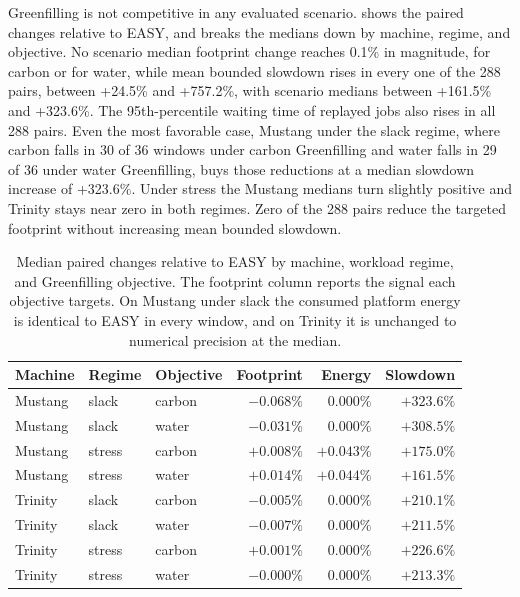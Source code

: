 Greenfilling is not competitive in any evaluated scenario.  shows the paired changes relative to EASY, and  breaks the medians down by machine, regime, and objective. No scenario median footprint change reaches 0.1\% in magnitude, for carbon or for water, while mean bounded slowdown rises in every one of the 288 pairs, between +24.5\% and +757.2\%, with scenario medians between +161.5\% and +323.6\%. The 95th-percentile waiting time of replayed jobs also rises in all 288 pairs. Even the most favorable case, Mustang under the slack regime, where carbon falls in 30 of 36 windows under carbon Greenfilling and water falls in 29 of 36 under water Greenfilling, buys those reductions at a median slowdown increase of +323.6\%. Under stress the Mustang medians turn slightly positive and Trinity stays near zero in both regimes. Zero of the 288 pairs reduce the targeted footprint without increasing mean bounded slowdown.

\begin{table}
\centering
\caption{Median paired changes relative to EASY by machine, workload regime, and Greenfilling objective. The footprint column reports the signal each objective targets. On Mustang under slack the consumed platform energy is identical to EASY in every window, and on Trinity it is unchanged to numerical precision at the median.}
\label{tab:greenfilling-breakdown}
\begin{tabular}{lllrrr}
\toprule
Machine & Regime & Objective & Footprint & Energy & Slowdown \\
\midrule
Mustang & slack & carbon & $-0.068\%$ & $0.000\%$ & $+323.6\%$ \\
Mustang & slack & water & $-0.031\%$ & $0.000\%$ & $+308.5\%$ \\
Mustang & stress & carbon & $+0.008\%$ & $+0.043\%$ & $+175.0\%$ \\
Mustang & stress & water & $+0.014\%$ & $+0.044\%$ & $+161.5\%$ \\
Trinity & slack & carbon & $-0.005\%$ & $0.000\%$ & $+210.1\%$ \\
Trinity & slack & water & $-0.007\%$ & $0.000\%$ & $+211.5\%$ \\
Trinity & stress & carbon & $+0.001\%$ & $0.000\%$ & $+226.6\%$ \\
Trinity & stress & water & $-0.000\%$ & $0.000\%$ & $+213.3\%$ \\
\bottomrule
\end{tabular}
\end{table}

